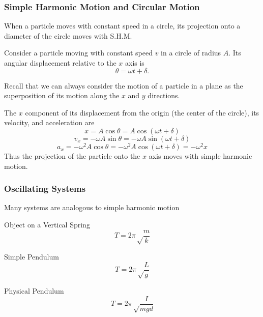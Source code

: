 \documentclass[letterpaper]{beamer}
\begin{document}
\begin{frame}
\frametitle{Simple Harmonic Motion and Circular Motion}

When a particle moves with constant speed in a circle, its projection onto a diameter of the circle moves with S.H.M.

Consider a particle moving with constant speed $v$ in a circle of radius $A$. Its angular displacement relative to the $x$ axis is $$\theta = \omega t + \delta.$$

Recall that we can always consider the motion of a particle in a plane as the superposition of its motion along the $x$ and $y$ directions.

The $x$ component of its displacement from the origin (the center of the circle), its velocity, and acceleration are
$$x = A\cos\theta = A\cos(\omega t + \delta)$$
$$v_x = -\omega A\sin\theta = -\omega A\sin(\omega t + \delta)$$
$$a_x = -\omega^2A\cos\theta = -\omega^2A\cos(\omega t + \delta) = -\omega^2x$$
Thus the projection of the particle onto the $x$ axis moves with simple harmonic motion.
\end{frame}

\begin{frame}
\frametitle{Oscillating Systems}
Many systems are analogous to simple harmonic motion

\begin{block}{Object on a Vertical Spring}
$$T = 2\pi\sqrt\frac{m}{k}$$
\end{block}

\begin{block}{Simple Pendulum}
$$T = 2\pi\sqrt\frac{L}{g}$$
\end{block}

\begin{block}{Physical Pendulum}
$$T = 2\pi\sqrt\frac{I}{mgd}$$
\end{block}

\end{frame}
\end{document}
